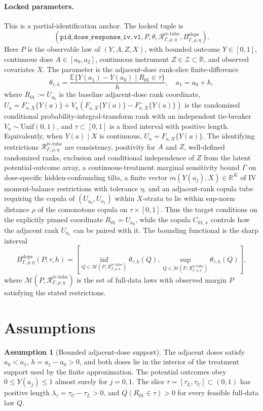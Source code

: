 \documentclass[11pt]{article}
\newcommand{\E}{\mathbb{E}}
\theoremstyle{definition}
\newtheorem{assumption}{Assumption}
\theoremstyle{plain}
\theoremstyle{remark}
\begin{document}
\paragraph{Locked parameters.}
This is a partial-identification anchor.  The locked tuple is
\[
(\texttt{pid\_dose\_response\_iv},\texttt{v1},
P,\theta,\mathcal R_{\Gamma,\rho,\eta}^{\mathrm{iv\text{-}tube}},B_{\Gamma,\rho,\eta}^{\mathrm{slope}}).
\]
Here \(P\) is the observable law of \((Y,A,Z,X)\), with bounded outcome \(Y\in[0,1]\), continuous dose \(A\in[a_0,a_2]\), continuous instrument \(Z\in\mathcal Z\subset\mathbb R\), and observed covariates \(X\).  The parameter is the adjacent-dose rank-slice finite-difference
\[
\theta_{\tau,h}=\frac{\E\{Y(a_1)-Y(a_0)\mid R_{01}\in\tau\}}{h},
\quad a_1=a_0+h,
\]
where \(R_{01}:=U_{a_0}\) is the baseline adjacent-dose rank coordinate, \(U_a=F^-_{a,X}\{Y(a)\}+V_a(F_{a,X}\{Y(a)\}-F^-_{a,X}\{Y(a)\})\) is the randomized conditional probability-integral-transform rank with an independent tie-breaker \(V_a\sim\mathrm{Unif}(0,1)\), and \(\tau\subset[0,1]\) is a fixed interval with positive length.  Equivalently, when \(Y(a)\mid X\) is continuous, \(U_a=F_{a,X}\{Y(a)\}\).  The identifying restrictions \(\mathcal R_{\Gamma,\rho,\eta}^{\mathrm{iv\text{-}tube}}\) are consistency, positivity for \(A\) and \(Z\), well-defined randomized ranks, exclusion and conditional independence of \(Z\) from the latent potential-outcome array, a continuous-treatment marginal sensitivity bound \(\Gamma\) on dose-specific hidden-confounding tilts, a finite vector \(m(Y(a_j),X)\in\mathbb R^K\) of IV moment-balance restrictions with tolerance \(\eta\), and an adjacent-rank copula tube requiring the copula of \((U_{a_0},U_{a_1})\) within \(X\)-strata to lie within sup-norm distance \(\rho\) of the comonotone copula on \(\tau\times[0,1]\).  Thus the target conditions on the explicitly pinned coordinate \(R_{01}=U_{a_0}\), while the copula \(C_{01,x}\) controls how the adjacent rank \(U_{a_1}\) can be paired with it.  The bounding functional is the sharp interval
\[
B_{\Gamma,\rho,\eta}^{\mathrm{slope}}(P;\tau,h)=
\left[\inf_{Q\in\mathcal M(P,\mathcal R_{\Gamma,\rho,\eta}^{\mathrm{iv\text{-}tube}})}\theta_{\tau,h}(Q),
\sup_{Q\in\mathcal M(P,\mathcal R_{\Gamma,\rho,\eta}^{\mathrm{iv\text{-}tube}})}\theta_{\tau,h}(Q)\right],
\]
where \(\mathcal M(P,\mathcal R_{\Gamma,\rho,\eta}^{\mathrm{iv\text{-}tube}})\) is the set of full-data laws with observed margin \(P\) satisfying the stated restrictions.

\section{Assumptions}
\begin{assumption}[Bounded adjacent-dose support]\label{ass:bounded-support}
The adjacent doses satisfy \(a_0<a_1\), \(h=a_1-a_0>0\), and both doses lie in the interior of the treatment support used by the finite approximation.  The potential outcomes obey \(0\le Y(a_j)\le 1\) almost surely for \(j=0,1\).  The slice \(\tau=[\tau_L,\tau_U]\subset(0,1)\) has positive length \(\lambda_\tau=\tau_U-\tau_L>0\), and \(Q(R_{01}\in\tau)>0\) for every feasible full-data law \(Q\).
\end{assumption}
\end{document}

